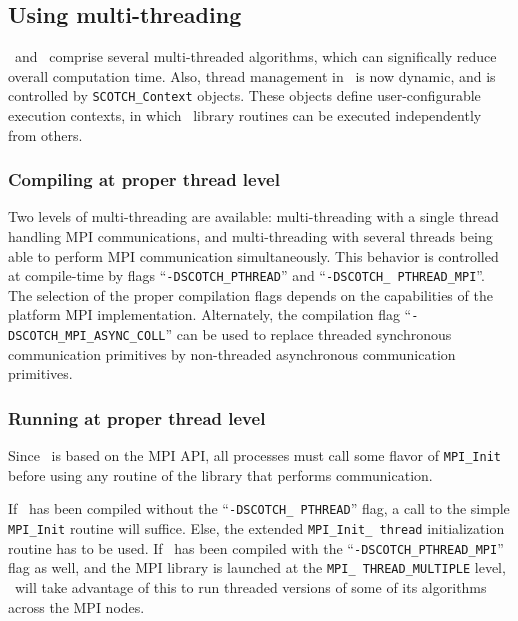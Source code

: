 \subsection{Using multi-threading}
\label{sec-lib-thread}

\scotch\ and \ptscotch\ comprise several multi-threaded algorithms,
which can significally reduce overall computation time. Also, thread
management in \scotch\ is now dynamic, and is controlled by
\texttt{SCOTCH\_\lbt Context} objects. These objects define
user-configurable execution contexts, in which \libptscotch\ library
routines can be executed independently from others.

\subsubsection{Compiling at proper thread level}

Two levels of multi-threading are available: multi-threading with a
single thread handling MPI communications, and multi-threading with
several threads being able to perform MPI communication
simultaneously. This behavior is controlled at compile-time by flags
``\texttt{-DSCOTCH\_\lbt PTHREAD}'' and ``\texttt{-DSCOTCH\_\lbt
PTHREAD\_\lbt MPI}''. The selection of the proper compilation flags
depends on the capabilities of the platform MPI
implementation. Alternately, the compilation flag
``\texttt{-DSCOTCH\_\lbt MPI\_\lbt ASYNC\_\lbt COLL}'' can be
used to replace threaded synchronous communication primitives by
non-threaded asynchronous communication primitives.

\subsubsection{Running at proper thread level}

Since \ptscotch\ is based on the MPI API, all processes must call some
flavor of \texttt{MPI\_\lbt Init} before using any routine of the
library that performs communication.

If \ptscotch\ has been compiled without the ``\texttt{-DSCOTCH\_\lbt
PTHREAD}'' flag, a call to the simple \texttt{MPI\_\lbt Init} routine
will suffice. Else, the extended \texttt{MPI\_\lbt Init\_\lbt
thread} initialization routine has to be used. If \ptscotch\ has been
compiled with the ``\texttt{-DSCOTCH\_\lbt PTHREAD\_\lbt MPI}'' flag
as well, and the MPI library is launched at the \texttt{MPI\_\lbt
THREAD\_\lbt MULTIPLE} level, \ptscotch\ will take advantage of this
to run threaded versions of some of its algorithms across the MPI
nodes.

